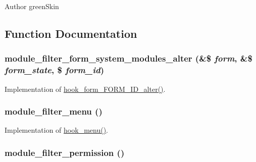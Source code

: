\begin{DoxyAuthor}{Author}
greenSkin 
\end{DoxyAuthor}


\subsection{Function Documentation}
\hypertarget{module__filter_8module_aac9264bd5392b27f02a2d1c8f9e01ab4}{
\subsubsection[{module\_\-filter\_\-form\_\-system\_\-modules\_\-alter}]{\setlength{\rightskip}{0pt plus 5cm}module\_\-filter\_\-form\_\-system\_\-modules\_\-alter (\&\$ {\em form}, \/  \&\$ {\em form\_\-state}, \/  \$ {\em form\_\-id})}}
\label{module__filter_8module_aac9264bd5392b27f02a2d1c8f9e01ab4}
Implementation of \hyperlink{group__hooks_ga8d4a4089551493d55911bd5c4f218264}{hook\_\-form\_\-FORM\_\-ID\_\-alter()}. \hypertarget{module__filter_8module_a050928e7cb73c7a13c98238938fd4870}{
\subsubsection[{module\_\-filter\_\-menu}]{\setlength{\rightskip}{0pt plus 5cm}module\_\-filter\_\-menu ()}}
\label{module__filter_8module_a050928e7cb73c7a13c98238938fd4870}
Implementation of \hyperlink{group__hooks_ga5c95244fea59b25666e409759e133ded}{hook\_\-menu()}. \hypertarget{module__filter_8module_a56a363584cb3cf1fb9e77576ff2084e1}{
\subsubsection[{module\_\-filter\_\-permission}]{\setlength{\rightskip}{0pt plus 5cm}module\_\-filter\_\-permission ()}}
